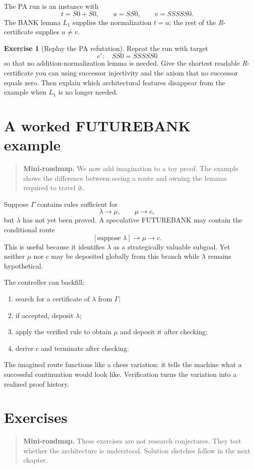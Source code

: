\documentclass[11pt,openany]{book}
\theoremstyle{definition}
\newtheorem{exercise}[theorem]{Exercise}
\theoremstyle{remark}
\newenvironment{miniroadmap}{\begin{quote}\small\color{deepblue}\textbf{Mini-roadmap.} }{\end{quote}}
\begin{document}
The PA run is an instance with
\[
t=S0+S0,\qquad u=SS0,\qquad v=SSSSS0.
\]
The BANK lemma $L_1$ supplies the normalization $t=u$; the rest of the $R$-certificate supplies $u\neq v$.

\begin{exercise}[Replay the PA refutation]\label{ex:pa115}
Repeat the run with target
\[
c':\quad SS0=SSSSS0
\]
so that no addition-normalization lemma is needed. Give the shortest readable $R$-certificate you can using successor injectivity and the axiom that no successor equals zero. Then explain which architectural features disappear from the example when $L_1$ is no longer needed.
\end{exercise}


\chapter{A worked FUTUREBANK example}
\begin{miniroadmap}
We now add imagination to a toy proof. The example shows the difference between seeing a route and owning the lemmas required to travel it.
\end{miniroadmap}

Suppose $\Gamma$ contains rules sufficient for
\[
\lambda\to\mu,\qquad \mu\to c,
\]
but $\lambda$ has not yet been proved. A speculative FUTUREBANK may contain the conditional route
\[
[\text{suppose }\lambda]\to\mu\to c.
\]
This is useful because it identifies $\lambda$ as a strategically valuable subgoal. Yet neither $\mu$ nor $c$ may be deposited globally from this branch while $\lambda$ remains hypothetical.

The controller can backfill:
\begin{enumerate}
\item search for a certificate of $\lambda$ from $\Gamma$;
\item if accepted, deposit $\lambda$;
\item apply the verified rule to obtain $\mu$ and deposit it after checking;
\item derive $c$ and terminate after checking.
\end{enumerate}
The imagined route functions like a chess variation: it tells the machine what a successful continuation would look like. Verification turns the variation into a realized proof history.

\chapter{Exercises}
\begin{miniroadmap}
These exercises are not research conjectures. They test whether the architecture is understood. Solution sketches follow in the next chapter.
\end{miniroadmap}
\end{document}
